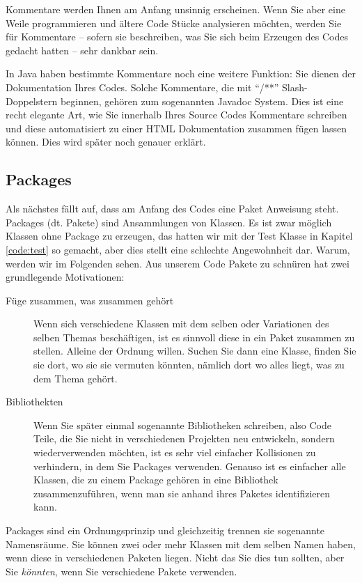 Kommentare werden Ihnen am Anfang unsinnig erscheinen. Wenn Sie aber eine Weile programmieren und ältere Code Stücke analysieren möchten, werden Sie für Kommentare -- sofern sie beschreiben, was Sie sich beim Erzeugen des Codes gedacht hatten -- sehr dankbar sein.

In Java haben bestimmte Kommentare noch eine weitere Funktion: Sie dienen der Dokumentation Ihres Codes. Solche Kommentare, die mit "`/**"' Slash-Doppelstern beginnen, gehören zum sogenannten Javadoc System. Dies ist eine recht elegante Art, wie Sie innerhalb Ihres Source Codes Kommentare schreiben und diese automatisiert zu einer HTML Dokumentation zusammen fügen lassen können. Dies wird später noch genauer erklärt.  

\subsection{Packages}\label{sect:package}
Als nächstes fällt auf, dass am Anfang des Codes eine Paket Anweisung steht. Packages (dt. Pakete) sind Ansammlungen von Klassen. Es ist zwar möglich Klassen ohne Package zu erzeugen, das hatten wir mit der Test Klasse in Kapitel \ref{code:test} so gemacht, aber dies stellt eine schlechte Angewohnheit dar. Warum, werden wir im Folgenden sehen. Aus unserem Code Pakete zu schnüren hat zwei grundlegende Motivationen: 

\begin{description}
\item[Füge zusammen, was zusammen gehört]
Wenn sich verschiedene Klassen mit dem selben oder Variationen des selben Themas beschäftigen, ist es sinnvoll diese in ein Paket zusammen zu stellen. Alleine der Ordnung willen. Suchen Sie dann eine Klasse, finden Sie sie dort, wo sie sie vermuten könnten, nämlich dort wo alles liegt, was zu dem Thema gehört. 
\item[Bibliothekten]
Wenn Sie später einmal sogenannte Bibliotheken schreiben, also Code Teile, die Sie nicht in verschiedenen Projekten neu entwickeln, sondern wiederverwenden möchten, ist es sehr viel einfacher Kollisionen zu verhindern, in dem Sie Packages verwenden. Genauso ist es einfacher alle Klassen, die zu einem Package gehören in eine Bibliothek zusammenzuführen, wenn man sie anhand ihres Paketes identifizieren kann. 
\end{description}

Packages sind ein Ordnungsprinzip und gleichzeitig trennen sie sogenannte Namensräume. Sie können zwei oder mehr Klassen mit dem selben Namen haben, wenn diese in verschiedenen Paketen liegen. Nicht das Sie dies tun sollten, aber Sie \textit{könnten}, wenn Sie verschiedene Pakete verwenden.

